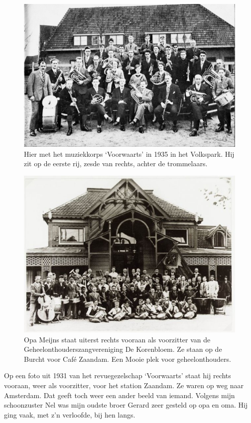 \documentclass[12pt,twoside]{memoir}
\begin{document}
\begin{figure}
\includegraphics[width=\textwidth]{img/ch2/ch2-afb04}
\caption*{\footnotesize Hier met het muziekkorps `Voorwaarts' in 1935 in het Volkspark. Hij zit op de eerste rij, zesde van rechts, achter de trommelaars.}
\end{figure}

\begin{figure}
\includegraphics[width=\textwidth]{img/ch2/ch2-afb05}
\caption*{\footnotesize Opa Meijns staat uiterst rechts vooraan als voorzitter van de Geheelonthouderszangvereniging De Korenbloem. Ze staan op de Burcht voor Café Zaandam. Een Mooie plek voor geheelonthouders.}
\end{figure}

Op een foto uit 1931 van het revuegezelschap `Voorwaarts' staat hij rechts vooraan, weer als voorzitter, voor het station Zaandam. Ze waren op weg naar Amsterdam. Dat geeft toch weer een ander beeld van iemand. Volgens mijn schoonzuster Nel was mijn oudste broer Gerard zeer gesteld op opa en oma. Hij ging vaak, met z’n verloofde, bij hen langs. 
\end{document}
